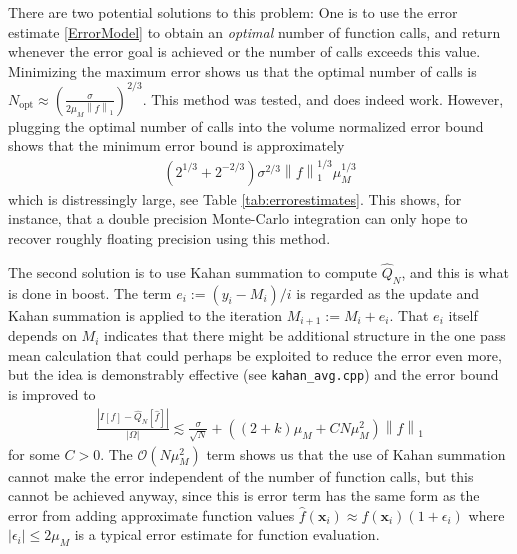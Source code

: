 \documentclass{ansarticle}
\begin{document}
There are two potential solutions to this problem: One is to use the error estimate \ref{ErrorModel} to obtain an \emph{optimal} number of function calls, and return whenever the error goal is achieved or the number of calls exceeds this value.
Minimizing the maximum error shows us that the optimal number of calls is $N_{\mathrm{opt}} \approx \left( \frac{\sigma}{2\mu_{M}\left\|f\right\|_{1}}\right)^{2/3}$.
This method was tested, and does indeed work.
However, plugging the optimal number of calls into the volume normalized error bound shows that the minimum error bound is approximately
\begin{align*}
(2^{1/3}+2^{-2/3})\sigma^{2/3}\left\|f\right\|_{1}^{1/3} \mu_{M}^{1/3}
\end{align*}
which is distressingly large, see Table \ref{tab:errorestimates}.
This shows, for instance, that a double precision Monte-Carlo integration can only hope to recover roughly floating precision using this method.

The second solution is to use Kahan summation to compute $\hat{Q}_{N}$, and this is what is done in boost.
The term $e_{i} := (y_{i} - M_{i})/i$ is regarded as the update and Kahan summation is applied to the iteration $M_{i+1} := M_{i} + e_{i}$.
That $e_{i}$ itself depends on $M_{i}$ indicates that there might be additional structure in the one pass mean calculation that could perhaps be exploited to reduce the error even more, but the idea is demonstrably effective (see \texttt{kahan_avg.cpp}) and the error bound is improved to
\begin{align}\label{KahanError}
\frac{\left| I[f] - \hat{Q}_{N}[\hat{f}] \right|}{|\Omega|} \lesssim \frac{\sigma}{\sqrt{N}} + ((2+k)\mu_{M} + CN\mu_{M}^2)\left\|f\right\|_{1}
\end{align}
for some $C > 0$.
The $\mathcal{O}(N\mu_{M}^2)$ term shows us that the use of Kahan summation cannot make the error independent of the number of function calls, but this cannot be achieved anyway, since this is error term has the same form as the error from adding approximate function values $\hat{f}(\mathbf{x}_{i}) \approx f(\mathbf{x}_{i})(1+\epsilon_{i})$ where $|\epsilon_{i}| \le 2\mu_{M}$ is a typical error estimate for function evaluation.
\end{document}
